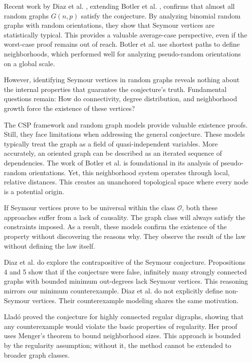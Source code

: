\documentclass[AMS, Times1COL]{article} %
\theoremstyle{definition}
\begin{document}
	Recent work by Diaz et al. \cite{Di}, extending Botler et al. \cite{BMN}, confirms that almost all random graphs $G(n, p)$ satisfy the conjecture. By analyzing binomial random graphs with random orientations, they show that Seymour vertices are statistically typical. This provides a valuable average-case perspective, even if the worst-case proof remains out of reach. Botler et al. use shortest paths to define neighborhoods, which performed well for analyzing pseudo-random orientations on a global scale.
	
	However, identifying Seymour vertices in random graphs reveals nothing about the internal properties that guarantee the conjecture's truth. Fundamental questions remain: How do connectivity, degree distribution, and neighborhood growth force the existence of these vertices?
	
	The CSP framework and random graph models provide valuable existence proofs. Still, they face limitations when addressing the general conjecture. These models typically treat the graph as a field of quasi-independent variables. More accurately, an oriented graph can be described as an iterated sequence of dependencies. The work of Botler et al. is foundational in its analysis of pseudo-random orientations. Yet, this neighborhood system operates through local, relative distances. This creates an unanchored topological space where every node is a potential origin.
	
	If Seymour vertices prove to be universal within the class $\mathcal{O}$, both these approaches suffer from a lack of causality. The graph class will always satisfy the constraints imposed. As a result, these models confirm the existence of the property without discovering the reasons why. They observe the result of the law without defining the law itself.
	
	Diaz et al. \cite{Di} do explore the contrapositive of the Seymour conjecture. Propositions 4 and 5 show that if the conjecture were false, infinitely many strongly connected graphs with bounded minimum out-degrees lack Seymour vertices. This reasoning mirrors our minimum counterexample. Diaz et al. do not explicitly define non-Seymour vertices. Their counterexample modeling shares the same motivation.
	
	Lladó \cite{Llado2013} proved the conjecture for highly connected regular digraphs, showing that any counterexample would violate the basic properties of regularity. Her proof uses Menger's theorem to bound neighborhood sizes. This approach is bounded by the regularity assumption; without it, the method cannot be extended to broader graph classes.
	
\end{document}

